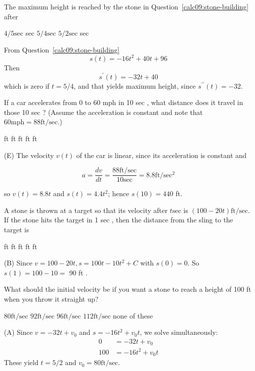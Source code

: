 \question
The maximum height is reached by the stone in Question~\ref{calc09:stone-building} after
\begin{choices}
  \choice $4 / 5 \mathrm{sec}$
   sec
  \CorrectChoice $5 / 4 \mathrm{sec}$
  \choice $5 / 2 \mathrm{sec}$
   sec
\end{choices}
\begin{solution}
From Question~\ref{calc09:stone-building}
\[
s(t)=-16 t^{2}+40 t+96
\]
Then
\[
s^{\prime}(t)=-32 t+40
\]
which is zero if $t=5 / 4$, and that yields maximum height, since $s^{\prime \prime}(t)=-32$.
\end{solution}


\newpage



\question
If a car accelerates from 0 to 60 mph in 10 sec , what distance does it travel in those 10 sec ? (Assume the acceleration is constant and note that $60 \mathrm{mph}=88 \mathrm{ft} / \mathrm{sec}$.)
\begin{choices}
   ft
   ft
   ft
   ft
   ft
\end{choices}
\begin{solution}
(E) The velocity $v(t)$ of the car is linear, since its acceleration is constant and

\[
a=\dfrac{d v}{d t}=\dfrac{88 \mathrm{ft} / \mathrm{sec}}{10 \mathrm{sec}}=8.8 \mathrm{ft} / \mathrm{sec}^{2}
\]

so $v(t)=8.8 t$ and $s(t)=4.4 t^{2}$; hence $s(10)=440$ ft.
\end{solution}

\question
A stone is thrown at a target so that its velocity after $t \mathrm{sec}$ is $(100-20 t) \mathrm{ft} / \mathrm{sec}$. If the stone hits the target in 1 sec , then the distance from the sling to the target is
\begin{choices}
   ft
   ft
   ft
   ft
   ft
\end{choices}
\begin{solution}
(B) Since $v=100-20 t, s=100 t-10 t^{2}+C$ with $s(0)=0$. So $s(1)=100-10=$ 90 ft .
\end{solution}

\question
What should the initial velocity be if you want a stone to reach a height of 100 ft when you throw it straight up?
\begin{choices}
  \CorrectChoice $80 \mathrm{ft} / \mathrm{sec}$
  \choice $92 \mathrm{ft} / \mathrm{sec}$
  \choice $96 \mathrm{ft} / \mathrm{sec}$
  \choice $112 \mathrm{ft} / \mathrm{sec}$
  \choice none of these
\end{choices}
\begin{solution}
(A) Since $v=-32 t+v_{0}$ and $s=-16 t^{2}+v_{0} t$, we solve simultaneously:
\[
\begin{aligned}
0 & =-32 t+v_{0} \\
100 & =-16 t^{2}+v_{0} t
\end{aligned}
\]
These yield $t=5 / 2$ and $v_{0}=80 \mathrm{ft} / \mathrm{sec}$.
\end{solution}


